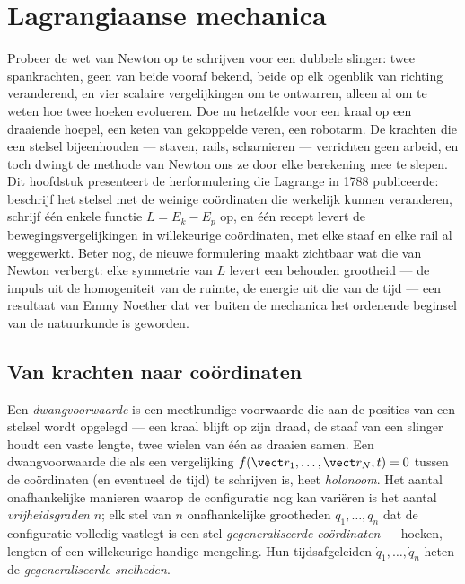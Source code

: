 \chapter{Lagrangiaanse mechanica}\label{ch:b3:lagrangian-mechanics}

Probeer de wet van Newton op te schrijven voor een dubbele slinger: twee
spankrachten, geen van beide vooraf bekend, beide op elk ogenblik van
richting veranderend, en vier scalaire vergelijkingen om te ontwarren,
alleen al om te weten hoe twee hoeken evolueren. Doe nu hetzelfde voor
een kraal op een draaiende hoepel, een keten van gekoppelde veren, een
robotarm. De krachten die een stelsel bijeenhouden --- staven, rails,
scharnieren --- verrichten geen arbeid, en toch dwingt de methode van
Newton ons ze door elke berekening mee te slepen. Dit hoofdstuk
presenteert de herformulering die Lagrange in 1788 publiceerde: beschrijf
het stelsel met de weinige coördinaten die werkelijk kunnen veranderen,
schrijf één enkele functie $L = E_k - E_p$ op, en één recept levert de
bewegingsvergelijkingen in willekeurige coördinaten, met elke staaf en
elke rail al weggewerkt. Beter nog, de nieuwe formulering maakt zichtbaar
wat die van Newton verbergt: elke symmetrie van $L$ levert een behouden
grootheid --- de impuls uit de homogeniteit van de ruimte, de energie uit
die van de tijd --- een resultaat van Emmy Noether dat ver buiten de
mechanica het ordenende beginsel van de natuurkunde is geworden.

\section{Van krachten naar coördinaten}

\begin{definition}\label{def:b3:lagrangian-mechanics:coordinates}
Een \emph{dwangvoorwaarde} is een meetkundige voorwaarde die aan de
posities van een stelsel wordt opgelegd --- een kraal blijft op zijn
draad, de staaf van een slinger houdt een vaste lengte, twee wielen van
één as draaien samen. Een dwangvoorwaarde die als een vergelijking
$f(\vect r_1, \dots, \vect r_N, t) = 0$ tussen de coördinaten (en
eventueel de tijd) te schrijven is, heet \emph{holonoom}. Het aantal
onafhankelijke manieren waarop de configuratie nog kan variëren is het
aantal \emph{vrijheidsgraden} $n$; elk stel van $n$ onafhankelijke
grootheden $q_1, \dots, q_n$ dat de configuratie volledig vastlegt is een
stel \emph{gegeneraliseerde coördinaten} --- hoeken, lengten of een
willekeurige handige mengeling. Hun tijdsafgeleiden
$\dot q_1, \dots, \dot q_n$ heten de \emph{gegeneraliseerde snelheden}.
\end{definition}

